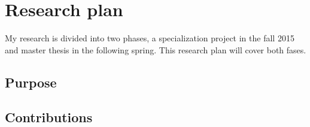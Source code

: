 \section*{Research plan}
My research is divided into two phases, a specialization project in the fall 2015 and master thesis in the following spring. This research plan will cover both fases.

\subsection*{Purpose}





\subsection*{Contributions}


